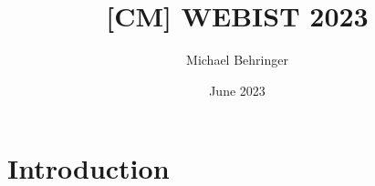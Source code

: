 \documentclass{article}
\title{[CM] WEBIST 2023}
\author{Michael Behringer}
\date{June 2023}
\begin{document}
\maketitle

\section{Introduction}
\end{document}
